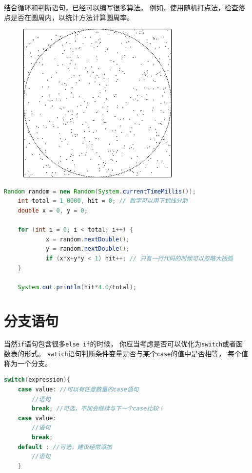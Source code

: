 \begin{example}
	结合循环和判断语句，已经可以编写很多算法。
	例如，使用随机打点法，检查落点是否在圆周内，以统计方法计算圆周率。
\end{example}

\begin{figure}[!htbp]
	\centerline{\includegraphics[scale=0.4]{part1/dot-pi.png}}
\end{figure}

\begin{lstlisting}[language=Java]
	Random random = new Random(System.currentTimeMillis());
	int total = 1_0000, hit = 0; // 数字可以用下划线分割
	double x = 0, y = 0;

	for (int i = 0; i < total; i++) {
			x = random.nextDouble();
			y = random.nextDouble();
			if (x*x+y*y < 1) hit++; // 只有一行代码的时候可以忽略大括弧
	}

	System.out.println(hit*4.0/total);
\end{lstlisting}

\section{分支语句}
当然\lstinline{if}语句包含很多\lstinline{else if}的时候，
你应当考虑是否可以优化为\lstinline{switch}或者函数表的形式。
\lstinline{swtich}语句判断条件变量是否与某个\lstinline{case}的值中是否相等，
每个值称为一个分支。

\begin{lstlisting}[language=Java]
	switch(expression){
	case value: //可以有任意数量的case语句
		//语句
		break; //可选，不加会继续与下一个case比较！
	case value:
		//语句
		break;
	default : //可选，建议经常添加
		//语句
	}
\end{lstlisting}

